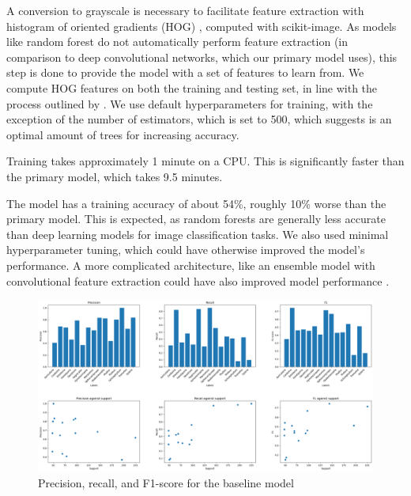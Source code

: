 \documentclass{article} %
\begin{document}
A conversion to grayscale is necessary to facilitate feature extraction with histogram of oriented gradients (HOG) \citep{AbouelnagaThambirajaEtAl.ObjectDetectionHistogram.2018}, computed with scikit-image. As models like random forest do not automatically perform feature extraction (in comparison to deep convolutional networks, which our primary model uses), this step is done to provide the model with a set of features to learn from. We compute HOG features on both the training and testing set, in line with the process outlined by \cite{Dutta.RandomForestImage.2024}. We use default hyperparameters for training, with the exception of the number of estimators, which is set to 500, which \cite{Xi.ImageClassificationRecognition.2022} suggests is an optimal amount of trees for increasing accuracy.

Training takes approximately 1 minute on a CPU. This is significantly faster than the primary model, which takes 9.5 minutes.

The model has a training accuracy of about 54\%, roughly 10\% worse than the primary model. This is expected, as random forests are generally less accurate than deep learning models for image classification tasks. We also used minimal hyperparameter tuning, which could have otherwise improved the model's performance. A more complicated architecture, like an ensemble model with convolutional feature extraction could have also improved model performance \citep{Xi.ImageClassificationRecognition.2022}.

\begin{figure}[h]
    \begin{center}
    \includegraphics[width=1.0\textwidth]{figures/baseline.png}
    \end{center}
    \caption{Precision, recall, and F1-score for the baseline model}
\end{figure}
\end{document}
